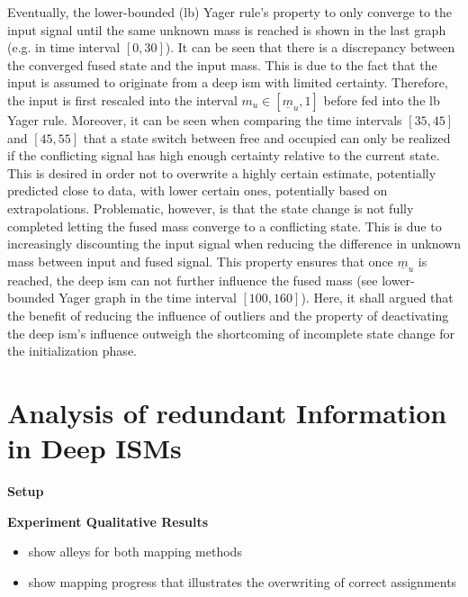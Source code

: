 Eventually, the lower-bounded (lb) Yager rule's property to only converge to the input signal until the same unknown mass is reached is shown in the last graph (e.g. in time interval $[0, 30]$). It can be seen that there is a discrepancy between the converged fused state and the input mass. This is due to the fact that the input is assumed to originate from a deep \gls{ism} with limited certainty. Therefore, the input is first rescaled into the interval $m_u \in [\underline{m}_u, 1]$ before fed into the lb Yager rule. Moreover, it can be seen when comparing the time intervals $[35, 45]$ and $[45, 55]$ that a state switch between free and occupied can only be realized if the conflicting signal has high enough certainty relative to the current state. This is desired in order not to overwrite a highly certain estimate, potentially predicted close to data, with lower certain ones, potentially based on extrapolations. Problematic, however, is that the state change is not fully completed letting the fused mass converge to a conflicting state. This is due to increasingly discounting the input signal when reducing the difference in unknown mass between input and fused signal. This property ensures that once $\underline{m}_u$ is reached, the deep \gls{ism} can not further influence the fused mass (see lower-bounded Yager graph in the time interval $[100, 160]$). Here, it shall argued that the benefit of reducing the influence of outliers and the property of deactivating the deep \gls{ism}'s influence outweigh the shortcoming of incomplete state change for the initialization phase. 
%
\section{Analysis of redundant Information in Deep ISMs}
\label{sec:exp_analyze_redundant_info}
\textbf{Setup}

\textbf{Experiment Qualitative Results}
\begin{itemize}
	\item show alleys for both mapping methods
	\item show mapping progress that illustrates the overwriting of correct assignments 
\end{itemize}

